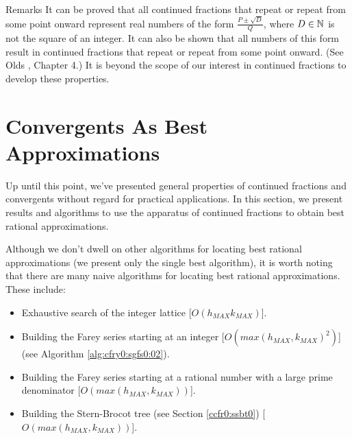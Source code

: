 \begin{vworkexampleparsection}{Remarks}
It can be proved that all continued fractions that repeat or repeat
from some point onward 
represent real numbers of the form $\frac{P \pm \sqrt{D}}{Q}$,
where $D \in {\mathbb{N}}$ is not the square of an integer.  
It can also be shown
that all numbers of this form result in continued fractions that
repeat or repeat from some point onward.  (See Olds 
\cite{bibref:b:OldsClassic}, Chapter 4.)  It is beyond the scope
of our interest in continued fractions to develop these properties.
\end{vworkexampleparsection}
\vworkexamplefooter{}


\section{Convergents As Best Approximations}

Up until this point, we've presented general properties of continued
fractions and convergents without regard for practical applications.
In this section, we present results and algorithms to use the 
apparatus of continued fractions to obtain best rational approximations.

Although we don't dwell on other algorithms for locating best 
rational approximations (we present only the single best
algorithm), it is worth noting that there are many naive algorithms
for locating best rational approximations.  These include:

\begin{itemize}

\item  Exhaustive search of the integer lattice
       [$O(h_{MAX} k_{MAX})$].

\item  Building the Farey series starting at an
       integer [$O(max(h_{MAX}, k_{MAX})^2)$]
	   (see Algorithm \cfryzeroxrefhyphen{}\ref{alg:cfry0:sgfs0:02}).

\item  Building the Farey series starting at a rational number with
       a large prime denominator [$O(max(h_{MAX}, k_{MAX}))$].

\item  Building the Stern-Brocot tree (see Section \ref{ccfr0:ssbt0})
       [$O(max(h_{MAX}, k_{MAX}))$].

\end{itemize}

